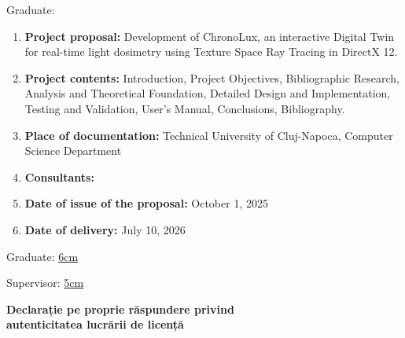 \vspace{2cm}

\begin{center}
	Graduate: {\bf \thesisauthor}

	\vspace{1cm}

	{\bf \thesistitle}
\end{center}

\vspace{5mm}

\begin{enumerate}
	\item {\bf Project proposal:} Development of ChronoLux, an interactive Digital Twin for real-time light dosimetry using Texture Space Ray Tracing in DirectX 12.
	\item {\bf Project contents:} Introduction, Project Objectives, Bibliographic Research, Analysis and Theoretical Foundation, Detailed Design and Implementation, Testing and Validation, User's Manual, Conclusions, Bibliography.
	\item {\bf Place of documentation:} Technical University of Cluj-Napoca, Computer Science Department
	\item {\bf Consultants:}
	\item {\bf Date of issue of the proposal:} October 1, 2025
	\item {\bf Date of delivery:} July 10, 2026
\end{enumerate}
\vspace{1.2cm}

\hspace{6cm} Graduate: \uline{6cm}

\vspace{0.5cm}
\hspace{6cm} Supervisor: \uline{5cm}
\newpage
\begin{center}
	{\department}
\end{center}
\vspace{1cm}
\begin{center}
	{\bf Declarație pe proprie răspundere privind\\
		autenticitatea lucrării de licență}
\end{center}
\vspace{1cm}

